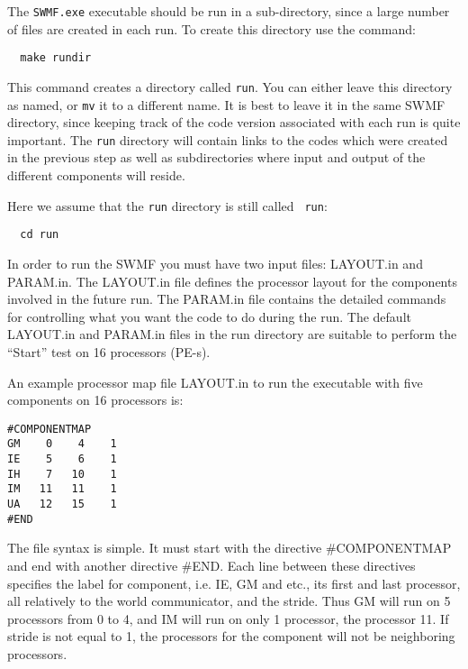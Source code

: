 The {\tt SWMF.exe} executable should be run in a sub-directory, since a large number
of files are created in each run.  To create this directory use the
command:
\begin{verbatim}
  make rundir
\end{verbatim} 
This command creates a directory called {\tt run}.  You can either
leave this directory as named, or {\tt mv} it to a different name.  It
is best to leave it in the same SWMF directory, since
keeping track of the code version associated with each run is quite
important.  The {\tt run} directory will contain links to the codes
which were created in the previous step as well as subdirectories
where input and output of the different components will reside.

Here we assume that the {\tt run} directory is still called {\tt
run}:
\begin{verbatim}
  cd run
\end{verbatim}
In order to run the SWMF you must have two input files:  LAYOUT.in and
PARAM.in.  The LAYOUT.in file defines the processor
layout for the components involved in the future run.  The PARAM.in
file contains the detailed commands for controlling what you want the
code to do during the run.  The default LAYOUT.in and PARAM.in
files in the run directory are suitable to perform the ``Start'' test
on 16 processors (PE-s). 

An example processor map file LAYOUT.in to run the executable with
five components on 16 processors is:
\begin{verbatim}
#COMPONENTMAP
GM    0    4    1
IE    5    6    1
IH    7   10    1
IM   11   11    1
UA   12   15    1
#END
\end{verbatim}
The file syntax is simple. It must start with the directive
\#COMPONENTMAP and end with another directive \#END. Each line between
these directives specifies the label for component, i.e. IE, GM and
etc., its first and last processor, all relatively to the world
communicator, and the stride. Thus GM will run on 5 processors from 0
to 4, and IM will run on only 1 processor, the processor 11.  If
stride is not equal to 1, the processors for the component will not be
neighboring processors.


